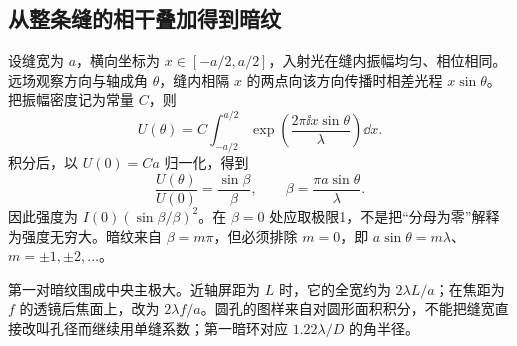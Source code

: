 \subsection{从整条缝的相干叠加得到暗纹}
设缝宽为 $a$，横向坐标为 $x\in[-a/2,a/2]$，入射光在缝内振幅均匀、相位相同。远场观察方向与轴成角 $\theta$，缝内相隔 $x$ 的两点向该方向传播时相差光程 $x\sin\theta$。把振幅密度记为常量 $C$，则
\[
 U(\theta)=C\int_{-a/2}^{a/2}
 \exp\!\left(\frac{2\pi\ii x\sin\theta}{\lambda}\right)\dd x.
\]
积分后，以 $U(0)=Ca$ 归一化，得到
\[
 \frac{U(\theta)}{U(0)}=\frac{\sin\beta}{\beta},
 \qquad \beta=\frac{\pi a\sin\theta}{\lambda}.
\]
因此强度为 $I(0)(\sin\beta/\beta)^2$。在 $\beta=0$ 处应取极限1，不是把“分母为零”解释为强度无穷大。暗纹来自 $\beta=m\pi$，但必须排除 $m=0$，即 $a\sin\theta=m\lambda$、$m=\pm1,\pm2,\ldots$。

第一对暗纹围成中央主极大。近轴屏距为 $L$ 时，它的全宽约为 $2\lambda L/a$；在焦距为 $f$ 的透镜后焦面上，改为 $2\lambda f/a$。圆孔的图样来自对圆形面积积分，不能把缝宽直接改叫孔径而继续用单缝系数；第一暗环对应 $1.22\lambda/D$ 的角半径。


\SingleSlitCurve


